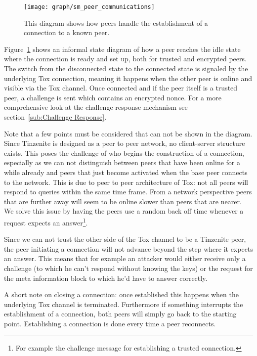 \begin{figure}[htp]
\centering
    \texttt{[image: graph/sm\_peer\_communications]}
\caption[Connection State Diagram]{This diagram shows how peers handle the establishment of a connection to a known peer.}
\label{graph:connection_states}
\end{figure}

Figure~\ref{graph:connection_states} shows an informal state diagram of how a peer reaches the idle state where the connection is ready and set up, both for trusted and encrypted peers.
The switch from the disconnected state to the connected state is signaled by the underlying Tox connection, meaning it happens when the other peer is online and visible via the Tox channel.
Once connected and if the peer itself is a trusted peer, a challenge is sent which contains an encrypted nonce.
For a more comprehensive look at the challenge response mechanism see section~\ref{sub:Challenge Response}.

Note that a few points must be considered that can not be shown in the diagram.
Since Tinzenite is designed as a peer to peer network, no client-server structure exists.
This poses the challenge of who begins the construction of a connection, especially as we can not distinguish between peers that have been online for a while already and peers that just become activated when the base peer connects to the network.
This is due to peer to peer architecture of Tox: not all peers will respond to queries within the same time frame.
From a network perspective peers that are further away will seem to be online slower than peers that are nearer.
We solve this issue by having the peers use a random back off time whenever a request expects an answer\footnote{For example the challenge message for establishing a trusted connection.}.

Since we can not trust the other side of the Tox channel to be a Tinzenite peer, the peer initiating a connection will not advance beyond the step where it expects an answer.
This means that for example an attacker would either receive only a challenge (to which he can't respond without knowing the keys) or the request for the meta information block to which he'd have to answer correctly.

A short note on closing a connection: once established this happens when the underlying Tox channel is terminated.
Furthermore if something interrupts the establishment of a connection, both peers will simply go back to the starting point.
Establishing a connection is done every time a peer reconnects.

